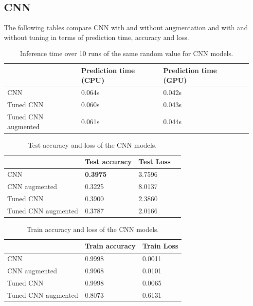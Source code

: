 \pagebreak

\subsection{CNN}
The following tables compare CNN with and without augmentation and with and without tuning in terms of prediction time, accuracy and loss.

\begin{table}
  \begin{tabular}{|l|l|l|l|}
    \hline
                        & Prediction time (CPU) & Prediction time (GPU) \\ \hline
    CNN                 & 0.064s                 & 0.042s                 \\ \hline
    Tuned CNN           & 0.060s                 & 0.043s                 \\ \hline
    Tuned CNN augmented & 0.061s                 & 0.044s                 \\ \hline
  \end{tabular}
  \caption{Inference time over 10 runs of the same random value for CNN models.}
  \label{table:pred_time}
\end{table}

\begin{table}
  \centering
  \begin{tabular}{|l|l|l|l|}
    \hline
                        & Test accuracy   & Test Loss \\ \hline
    CNN                 & \textbf{0.3975} & 3.7596    \\ \hline
    CNN augmented       & 0.3225          & 8.0137    \\ \hline
    Tuned CNN           & 0.3900          & 2.3860    \\ \hline
    Tuned CNN augmented & 0.3787          & 2.0166    \\ \hline
  \end{tabular}
  \caption{Test accuracy and loss of the CNN models.}
  \label{table:test_CNN}
\end{table}

\begin{table}
  \centering
  \begin{tabular}{|l|l|l|}
    \hline
                        & Train accuracy & Train Loss \\ \hline
    CNN                 & 0.9998         & 0.0011     \\ \hline
    CNN augmented       & 0.9968         & 0.0101     \\ \hline
    Tuned CNN           & 0.9998         & 0.0065     \\ \hline
    Tuned CNN augmented & 0.8073         & 0.6131     \\ \hline
  \end{tabular}
  \caption{Train accuracy and loss of the CNN models.}
  \label{table:train_CNN}
\end{table}

